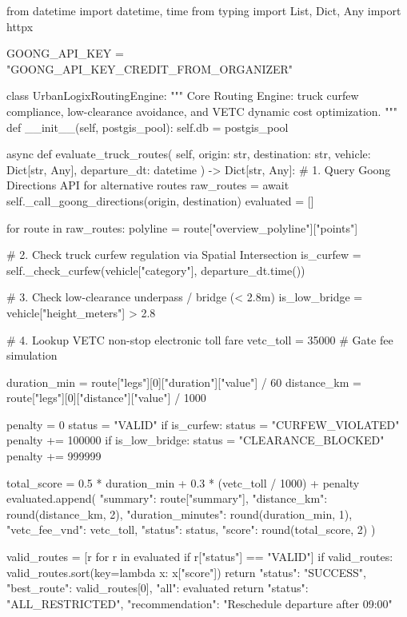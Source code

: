 \documentclass[11pt,a4paper]{article}
\begin{document}
\begin{pythoncode}
from datetime import datetime, time
from typing import List, Dict, Any
import httpx

GOONG_API_KEY = "GOONG_API_KEY_CREDIT_FROM_ORGANIZER"

class UrbanLogixRoutingEngine:
    """
    Core Routing Engine: truck curfew compliance,
    low-clearance avoidance, and VETC dynamic cost optimization.
    """
    def __init__(self, postgis_pool):
        self.db = postgis_pool

    async def evaluate_truck_routes(
        self, origin: str, destination: str, 
        vehicle: Dict[str, Any], departure_dt: datetime
    ) -> Dict[str, Any]:
        # 1. Query Goong Directions API for alternative routes
        raw_routes = await self._call_goong_directions(origin, destination)
        evaluated = []

        for route in raw_routes:
            polyline = route["overview_polyline"]["points"]
            
            # 2. Check truck curfew regulation via Spatial Intersection
            is_curfew = self._check_curfew(vehicle["category"], departure_dt.time())
            
            # 3. Check low-clearance underpass / bridge (< 2.8m)
            is_low_bridge = vehicle["height_meters"] > 2.8
            
            # 4. Lookup VETC non-stop electronic toll fare
            vetc_toll = 35000  # Gate fee simulation
            
            duration_min = route["legs"][0]["duration"]["value"] / 60
            distance_km = route["legs"][0]["distance"]["value"] / 1000
            
            penalty = 0
            status = "VALID"
            if is_curfew:
                status = "CURFEW_VIOLATED"
                penalty += 100000
            if is_low_bridge:
                status = "CLEARANCE_BLOCKED"
                penalty += 999999
                
            total_score = 0.5 * duration_min + 0.3 * (vetc_toll / 1000) + penalty
            evaluated.append({
                "summary": route["summary"],
                "distance_km": round(distance_km, 2),
                "duration_minutes": round(duration_min, 1),
                "vetc_fee_vnd": vetc_toll,
                "status": status,
                "score": round(total_score, 2)
            })

        valid_routes = [r for r in evaluated if r["status"] == "VALID"]
        if valid_routes:
            valid_routes.sort(key=lambda x: x["score"])
            return {"status": "SUCCESS", "best_route": valid_routes[0], "all": evaluated}
        return {"status": "ALL_RESTRICTED", "recommendation": "Reschedule departure after 09:00"}
\end{pythoncode}
\end{document}

